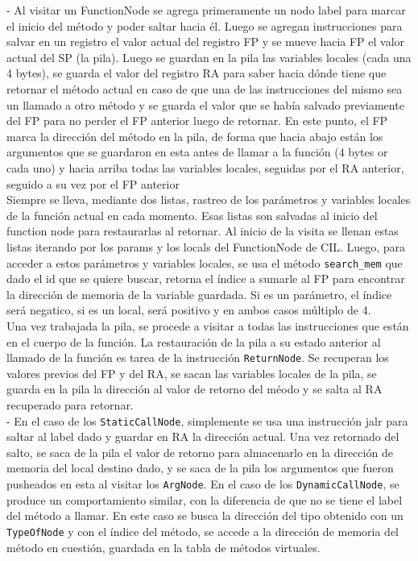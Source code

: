 \documentclass[a4paper,12pt]{article}
\def\code#1{\texttt{#1}}
\begin{document}
- Al visitar un FunctionNode se agrega primeramente un nodo label para marcar el inicio del método y poder saltar hacia él. Luego se agregan instrucciones para salvar en un registro el valor actual del registro FP y se mueve hacia FP el valor actual del SP (la pila). Luego se guardan en la pila las variables locales (cada una 4 bytes), se guarda el valor del registro RA para saber hacia dónde tiene que retornar el método actual en caso de que una de las instrucciones del mismo sea un llamado a otro método y se guarda el valor que se había salvado previamente del FP para no perder el FP anterior luego de retornar. En este punto, el FP marca la dirección del método en la pila, de forma que hacia abajo están los argumentos que se guardaron en esta antes de llamar a la función (4 bytes or cada uno) y hacia arriba todas las variables locales, seguidas por el RA anterior, seguido a su vez por el FP anterior\\
Siempre se lleva, mediante dos listas, rastreo de los parámetros y variables locales de la función actual en cada momento. Esas listas son salvadas al inicio del function node para restaurarlas al retornar. Al inicio de la visita se llenan estas listas iterando por los params y los locals del FunctionNode de CIL. Luego, para acceder a estos parámetros y variables locales, se usa el método \code{search\_mem} que dado el id que se quiere buscar, retorna el índice a sumarle al FP para encontrar la dirección de memoria de la variable guardada. Si es un parámetro, el índice será negatico, si es un local, será positivo y en ambos casos múltiplo de 4.\\
Una vez trabajada la pila, se procede a visitar a todas las instrucciones que están en el cuerpo de la función. La restauración de la pila a su estado anterior al llamado de la función es tarea de la instrucción \code{ReturnNode}. Se recuperan los valores previos del FP y del RA, se sacan las variables locales de la pila, se guarda en la pila la dirección al valor de retorno del méodo y se salta al RA recuperado para retornar.\\

- En el caso de los \code{StaticCallNode}, simplemente se usa una instrucción jalr para saltar al label dado y guardar en RA la dirección actual. Una vez retornado del salto, se saca de la pila el valor de retorno para almacenarlo en la dirección de memoria del local destino dado, y se saca de la pila los argumentos que fueron pusheados en esta al visitar los \code{ArgNode}. En el caso de los \code{DynamicCallNode}, se produce un comportamiento similar, con la diferencia de que no se tiene el label del método a llamar. En este caso se busca la dirección del tipo obtenido con un \code{TypeOfNode} y con el índice del método, se accede a la dirección de memoria del método en cuestión, guardada en la tabla de métodos virtuales.\\
\end{document}
